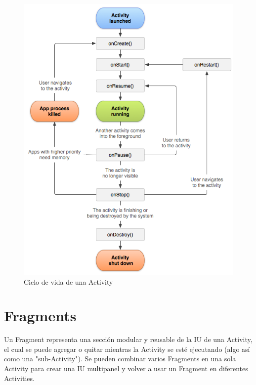 \begin{figure}[H]
  \centering
    \includegraphics[scale=0.4]{04-framework/activity_lifecycle.png} 
   \caption{Ciclo de vida de una Activity}
   \label{fig:umlFrameworkCore}
\end{figure}


\section{Fragments}
Un Fragment representa una sección modular y reusable de la IU de una Activity, el cual se puede agregar o quitar mientras la Activity se esté ejecutando (algo así como una "sub-Activity"). Se pueden combinar varios Fragments en una sola Activity para crear una IU multipanel y volver a usar un Fragment en diferentes Activities.


